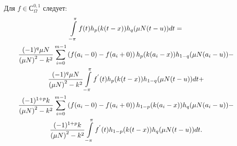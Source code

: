 \begin{lemma}\label{hlemma}
	Для $f \in С^{0,1}_\Omega$ следует:
	\begin{multline}\label{hlemma_eq1}
	\intop_{-\pi}^{\pi}f(t)h_{p}(k(t-x))h_{q}(\mu N(t-u))dt= \\
	\frac{(-1)^{q}\mu N}{\left(\mu N\right)^{2}-k^{2}}\sum_{i=0}^{m-1}\left(f(a_{i}-0)-f(a_{i}+0)\right)h_{p}(k(a_{i}-x))h_{1-q}(\mu N(a_{i}-u))-\\
	\frac{(-1)^{q}\mu N}{\left(\mu N\right)^{2}-k^{2}}\intop_{-\pi}^{\pi}f^{'}(t)h_{p}(k(t-x))h_{1-q}(\mu N(t-u))dt+\\
	\frac{(-1)^{1+p}k}{\left(\mu N\right)^{2}-k^{2}}\sum_{i=0}^{m-1}\left(f(a_{i}-0)-f(a_{i}+0)\right)h_{1-p}(k(a_{i}-x))h_{q}(\mu N(a_{i}-u))-\\
	\frac{(-1)^{1+p}k}{\left(\mu N\right)^{2}-k^{2}}\intop_{-\pi}^{\pi}f^{'}(t)h_{1-p}(k(t-x))h_{q}(\mu N(t-u))dt.
	\end{multline}
\end{lemma}


